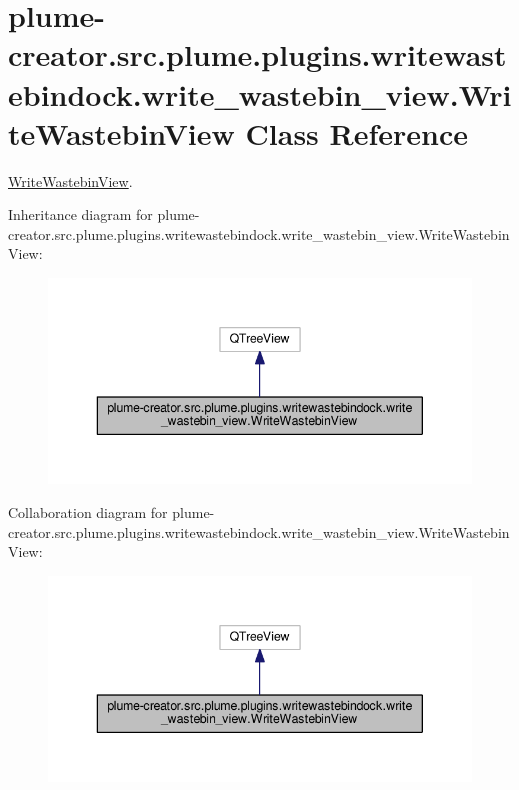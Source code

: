 \hypertarget{classplume-creator_1_1src_1_1plume_1_1plugins_1_1writewastebindock_1_1write__wastebin__view_1_1_write_wastebin_view}{}\section{plume-\/creator.src.\+plume.\+plugins.\+writewastebindock.\+write\+\_\+wastebin\+\_\+view.\+Write\+Wastebin\+View Class Reference}
\label{classplume-creator_1_1src_1_1plume_1_1plugins_1_1writewastebindock_1_1write__wastebin__view_1_1_write_wastebin_view}


\hyperlink{classplume-creator_1_1src_1_1plume_1_1plugins_1_1writewastebindock_1_1write__wastebin__view_1_1_write_wastebin_view}{Write\+Wastebin\+View}.  




Inheritance diagram for plume-\/creator.src.\+plume.\+plugins.\+writewastebindock.\+write\+\_\+wastebin\+\_\+view.\+Write\+Wastebin\+View\+:\nopagebreak
\begin{figure}[H]
\begin{center}
\leavevmode
\includegraphics[width=343pt]{classplume-creator_1_1src_1_1plume_1_1plugins_1_1writewastebindock_1_1write__wastebin__view_1_1_b7af140baedadb1073e8f8877c6363e5}
\end{center}
\end{figure}


Collaboration diagram for plume-\/creator.src.\+plume.\+plugins.\+writewastebindock.\+write\+\_\+wastebin\+\_\+view.\+Write\+Wastebin\+View\+:\nopagebreak
\begin{figure}[H]
\begin{center}
\leavevmode
\includegraphics[width=343pt]{classplume-creator_1_1src_1_1plume_1_1plugins_1_1writewastebindock_1_1write__wastebin__view_1_1_10fe60ddf485e2644b2240baa2765676}
\end{center}
\end{figure}
